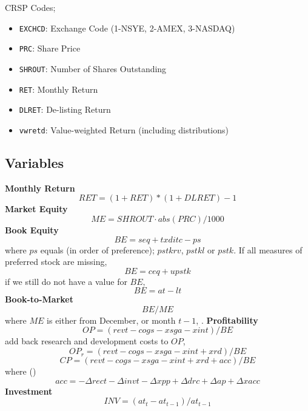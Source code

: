 CRSP Codes;
\begin{itemize}
  \item \texttt{EXCHCD}: Exchange Code (1-NSYE, 2-AMEX, 3-NASDAQ)
  \item \texttt{PRC}: Share Price
  \item \texttt{SHROUT}: Number of Shares Outstanding
  \item \texttt{RET}: Monthly Return
  \item \texttt{DLRET}: De-listing Return
  \item \texttt{vwretd}: Value-weighted Return (including distributions)
\end{itemize}

\subsection{Variables} \label{sec:variables}

\textbf{Monthly Return}
\[RET = (1 + RET) * (1 + DLRET) - 1\]
\textbf{Market Equity}
\[ME = SHROUT \cdot abs(PRC) / 1000\]
\textbf{Book Equity}
\[BE = seq + txditc - ps\]
where $ps$ equals (in order of preference); $pstkrv$, $pstkl$ or $pstk$.
If all measures of preferred stock are missing,
\[BE = ceq + upstk\]
if we still do not have a value for $BE$,
\[BE = at - lt\]
\textbf{Book-to-Market}
\[BE/ME\]
where $ME$ is either from December, \textcite{fama1992cross} or month $t-1$, 
\textcite{asness2013devil}.
\textbf{Profitability}
\[OP = (revt - cogs - xsga - xint)/BE\]
\textcite{fama2016choosing} add back research and development costs to $OP$,
\[OP_r = (revt - cogs - xsga - xint + xrd)/BE\]
\[CP = (revt - cogs - xsga - xint + xrd + acc)/BE\]
where (\parencite{ball2016accruals})
\[acc = -\Delta rect -\Delta invt -\Delta xpp +\Delta drc +\Delta ap +\Delta xacc\]
\textbf{Investment}
\[INV = (at_t - at_{t-1})/at_{t-1}\]





